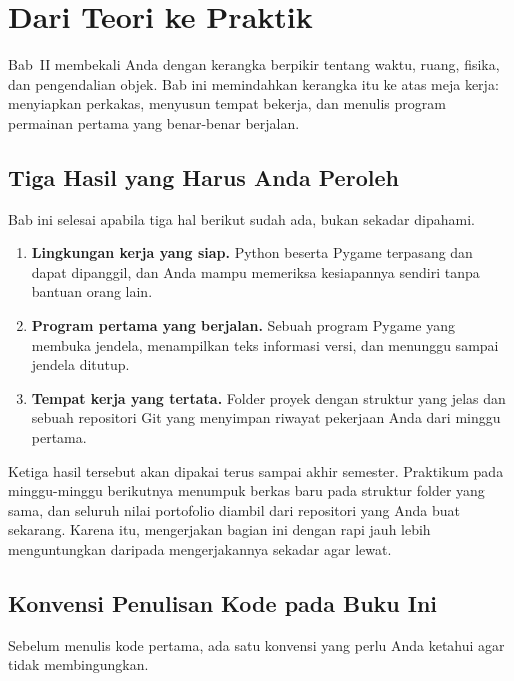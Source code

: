 \section{Dari Teori ke Praktik}
\label{sec:teori-ke-praktik}

Bab~II membekali Anda dengan kerangka berpikir tentang waktu, ruang, fisika,
dan pengendalian objek. Bab ini memindahkan kerangka itu ke atas meja kerja:
menyiapkan perkakas, menyusun tempat bekerja, dan menulis program permainan
pertama yang benar-benar berjalan.

\subsection{Tiga Hasil yang Harus Anda Peroleh}

Bab ini selesai apabila tiga hal berikut sudah ada, bukan sekadar dipahami.

\begin{enumerate}
  \item \textbf{Lingkungan kerja yang siap.} Python beserta Pygame terpasang
        dan dapat dipanggil, dan Anda mampu memeriksa kesiapannya sendiri
        tanpa bantuan orang lain.
  \item \textbf{Program pertama yang berjalan.} Sebuah program Pygame yang
        membuka jendela, menampilkan teks informasi versi, dan menunggu sampai
        jendela ditutup.
  \item \textbf{Tempat kerja yang tertata.} Folder proyek dengan struktur yang
        jelas dan sebuah repositori Git yang menyimpan riwayat pekerjaan Anda
        dari minggu pertama.
\end{enumerate}

Ketiga hasil tersebut akan dipakai terus sampai akhir semester. Praktikum pada
minggu-minggu berikutnya menumpuk berkas baru pada struktur folder yang sama,
dan seluruh nilai portofolio diambil dari repositori yang Anda buat sekarang.
Karena itu, mengerjakan bagian ini dengan rapi jauh lebih menguntungkan
daripada mengerjakannya sekadar agar lewat.

\subsection{Konvensi Penulisan Kode pada Buku Ini}

Sebelum menulis kode pertama, ada satu konvensi yang perlu Anda ketahui agar
tidak membingungkan.

